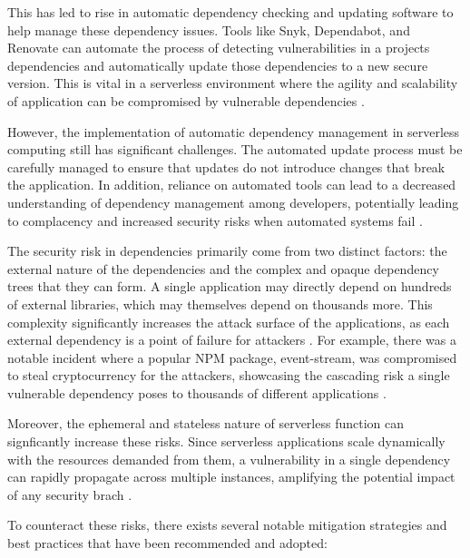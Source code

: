 \documentclass[sigconf]{acmart}
\begin{document}
This has led to rise in automatic dependency checking and updating software to help manage these dependency issues. Tools like Snyk, Dependabot, and Renovate can automate the process of detecting vulnerabilities in a projects dependencies and automatically update those dependencies to a new secure version. This is vital in a serverless environment where the agility and scalability of application can be compromised by vulnerable dependencies \cite{estrin2021handbook}. 

However, the implementation of automatic dependency management in serverless computing still has significant challenges. The automated update process must be carefully managed to ensure that updates do not introduce changes that break the application. In addition, reliance on automated tools can lead to a decreased understanding of dependency management among developers, potentially leading to complacency and increased security risks when automated systems fail \cite{hilton2016ci}.

The security risk in dependencies primarily come from two distinct factors: the external nature of the dependencies and the complex and opaque dependency trees that they can form. A single application may directly depend on hundreds of external libraries, which may themselves depend on thousands more. This complexity significantly increases the attack surface of the applications, as each external dependency is a point of failure for attackers \cite{OWASP2021top}. For example, there was a notable incident where a popular NPM package, event-stream, was compromised to steal cryptocurrency for the attackers, showcasing the cascading risk a single vulnerable dependency poses to thousands of different applications \cite{fox2018open}.

Moreover, the ephemeral and stateless nature of serverless function can signficantly increase these risks. Since serverless applications scale dynamically with the resources demanded from them, a vulnerability in a single dependency can rapidly propagate across multiple instances, amplifying the potential impact of any security brach \cite{kavis2014cloud}.

To counteract these risks, there exists several notable mitigation strategies and best practices that have been recommended and adopted:
\end{document}
